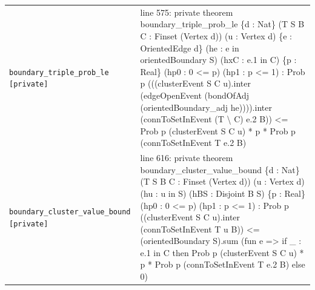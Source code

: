 \documentclass[10pt]{article}
\begin{document}
\begin{longtable}{>{\raggedright\arraybackslash}p{} >{\raggedright\arraybackslash}p{}}
\texttt{boundary\_\allowbreak{}triple\_\allowbreak{}prob\_\allowbreak{}le [private]} & {\ttfamily\scriptsize line 575:\allowbreak{} private theorem boundary\_\allowbreak{}triple\_\allowbreak{}prob\_\allowbreak{}le \{d :\allowbreak{} Nat\} (\allowbreak{}T S B C :\allowbreak{} Finset (\allowbreak{}Vertex d)\allowbreak{})\allowbreak{} (\allowbreak{}u :\allowbreak{} Vertex d)\allowbreak{} \{e :\allowbreak{} OrientedEdge d\} (\allowbreak{}he :\allowbreak{} e in orientedBoundary S)\allowbreak{} (\allowbreak{}hxC :\allowbreak{} e.\allowbreak{}1 in C)\allowbreak{} \{p :\allowbreak{} Real\} (\allowbreak{}hp0 :\allowbreak{} 0 <=\allowbreak{} p)\allowbreak{} (\allowbreak{}hp1 :\allowbreak{} p <=\allowbreak{} 1)\allowbreak{} :\allowbreak{} Prob p (\allowbreak{}(\allowbreak{}(\allowbreak{}clusterEvent S C u)\allowbreak{}.\allowbreak{}inter (\allowbreak{}edgeOpenEvent (\allowbreak{}bondOfAdj (\allowbreak{}orientedBoundary\_\allowbreak{}adj he)\allowbreak{})\allowbreak{})\allowbreak{})\allowbreak{}.\allowbreak{}inter (\allowbreak{}connToSetInEvent (\allowbreak{}T \textbackslash{} C)\allowbreak{} e.\allowbreak{}2 B)\allowbreak{})\allowbreak{} <=\allowbreak{} Prob p (\allowbreak{}clusterEvent S C u)\allowbreak{} *\allowbreak{} p *\allowbreak{} Prob p (\allowbreak{}connToSetInEvent T e.\allowbreak{}2 B)\allowbreak{}} \\[0.45em]
\texttt{boundary\_\allowbreak{}cluster\_\allowbreak{}value\_\allowbreak{}bound [private]} & {\ttfamily\scriptsize line 616:\allowbreak{} private theorem boundary\_\allowbreak{}cluster\_\allowbreak{}value\_\allowbreak{}bound \{d :\allowbreak{} Nat\} (\allowbreak{}T S B C :\allowbreak{} Finset (\allowbreak{}Vertex d)\allowbreak{})\allowbreak{} (\allowbreak{}u :\allowbreak{} Vertex d)\allowbreak{} (\allowbreak{}hu :\allowbreak{} u in S)\allowbreak{} (\allowbreak{}hBS :\allowbreak{} Disjoint B S)\allowbreak{} \{p :\allowbreak{} Real\} (\allowbreak{}hp0 :\allowbreak{} 0 <=\allowbreak{} p)\allowbreak{} (\allowbreak{}hp1 :\allowbreak{} p <=\allowbreak{} 1)\allowbreak{} :\allowbreak{} Prob p (\allowbreak{}(\allowbreak{}clusterEvent S C u)\allowbreak{}.\allowbreak{}inter (\allowbreak{}connToSetInEvent T u B)\allowbreak{})\allowbreak{} <=\allowbreak{} (\allowbreak{}orientedBoundary S)\allowbreak{}.\allowbreak{}sum (\allowbreak{}fun e =\allowbreak{}> if \_\allowbreak{} :\allowbreak{} e.\allowbreak{}1 in C then Prob p (\allowbreak{}clusterEvent S C u)\allowbreak{} *\allowbreak{} p *\allowbreak{} Prob p (\allowbreak{}connToSetInEvent T e.\allowbreak{}2 B)\allowbreak{} else 0)\allowbreak{}} \\[0.45em]

\end{longtable}
\end{document}
